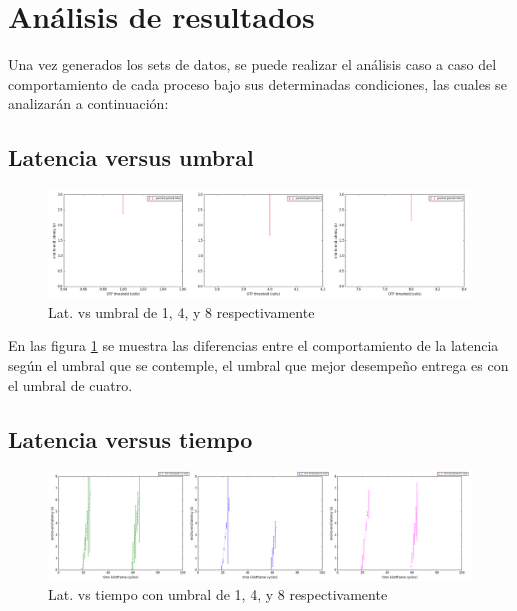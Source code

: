 \newpage


\section{Análisis de resultados}


Una vez generados los sets de datos, se puede realizar el análisis caso a caso del comportamiento de cada proceso bajo sus determinadas condiciones, las cuales se analizarán a continuación:

\subsection{Latencia versus umbral}

        \begin{figure}[h]
        \graphicspath{ {imagenes/agrupadas/} }
        \centering
        \includegraphics[width=1.0\textwidth]{lat_vs_threshold.png}
        \caption{Lat. vs umbral de 1, 4, y 8 respectivamente}
        \label{latvumbral1}
        \end{figure}


    En las figura \ref{latvumbral1} se muestra las diferencias entre el comportamiento de la latencia según el umbral que se contemple, el umbral que mejor desempeño entrega es con el umbral de cuatro.

\subsection{Latencia versus tiempo}

        \begin{figure}[h]
        \graphicspath{ {imagenes/agrupadas/} }
        \centering
        \includegraphics[width=1.0\textwidth]{latvtime.png}
        \caption{Lat. vs tiempo con umbral de 1, 4, y 8 respectivamente}
        \label{latvtime}
        \end{figure}

